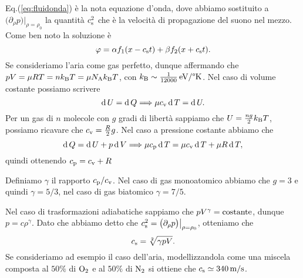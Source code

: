 \begin{example}
\begin{equation}
    \end{equation}
    Eq.(\ref{eq:fluidonda}) è la nota equazione d'onda, dove abbiamo sostituito a $\bigl( \partial_\rho p \bigr)\bigr|_{\rho = \rho_0}$ la quantità $c_\textup{s}^2$ che è la velocità di propagazione del suono nel mezzo. Come ben noto la soluzione è 
    \begin{equation*}
        \varphi = \alpha f_1(x - c_\textup{s}t) + \beta f_2(x + c_\textup{s}t).
    \end{equation*}
    Se consideriamo l'aria come gas perfetto, dunque affermando che $pV = \mu R T = n k_\textup{B} T = \mu N_\textup{A} k_\textup{B} T$, con $k_\textup{B} \sim \frac{1}{12000}\,\textup{eV}/\textup{°K}$. Nel caso di volume costante possiamo scrivere
    \begin{equation*}
        \operatorname{d} U = \operatorname{d} Q \Longrightarrow \mu c_\textup{v}\operatorname{d} T =\operatorname{d} U.
    \end{equation*}
    Per un gas di $n$ molecole con $g$ gradi di libertà sappiamo che $U = \frac{ng}{2}k_\textup{B}T$, possiamo ricavare che $c_\textup{v} = \frac{R}{2}g$. Nel caso a pressione costante abbiamo che 
    \begin{equation*}
        \operatorname{d} Q = \operatorname{d} U + p \operatorname{d} V \Longrightarrow \mu c_\textup{p} \operatorname{d} T = \mu c_\textup{v} \operatorname{d} T + \mu R \operatorname{d} T,
    \end{equation*}
    quindi ottenendo $c_\textup{p} = c_\textup{v} + R$
    \begin{definition}
        Definiamo $\gamma$ il rapporto $c_\textup{p} / c_\textup{v}$. Nel caso di gas monoatomico abbiamo che $g = 3$ e quindi $\gamma = 5/3$, nel caso di gas biatomico $\gamma = 7/5$. 
    \end{definition}
    Nel caso di trasformazioni adiabatiche sappiamo che $pV^\gamma = \textup{costante}$, dunque $p = c \rho^\gamma$. Dato che abbiamo detto che $c_\textup{s}^2 = \bigl( \partial_\rho p \bigr)\bigr|_{\rho = \rho_0}$, otteniamo che 
    \begin{equation*}
        c_\textup{s} = \sqrt[2]{\gamma pV}.
    \end{equation*}
    Se consideriamo ad esempio il caso dell'aria, modellizzandola come una miscela composta al $50\%$ di $\textup{O}_2$ e al $50\%$ di $\textup{N}_2$ si ottiene che $c_\textup{s} \simeq 340\,\textup{m}/\textup{s}$.
\end{example}
